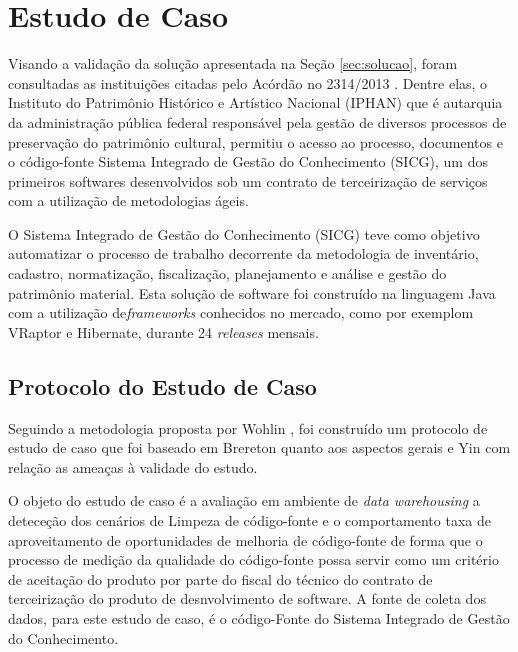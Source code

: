 \section {Estudo de Caso}

Visando a validação da solução apresentada na Seção \ref{sec:solucao}, foram consultadas as instituições citadas pelo Acórdão no 2314/2013 \cite{TCU:2013}. Dentre elas, o Instituto do Patrimônio Histórico e Artístico Nacional (IPHAN) que é autarquia da administração pública federal responsável pela gestão de diversos processos de preservação do patrimônio cultural, permitiu o acesso ao processo, documentos e o código-fonte Sistema Integrado de Gestão do Conhecimento (SICG), um dos primeiros softwares desenvolvidos sob um contrato de terceirização de serviços com a utilização de metodologias ágeis.

O Sistema Integrado de Gestão do Conhecimento (SICG) teve como objetivo automatizar o processo de trabalho decorrente da metodologia de inventário, cadastro, normatização, fiscalização, planejamento e análise e gestão do patrimônio material. Esta solução de software foi construído na linguagem Java com a utilização de\textit{frameworks} conhecidos no mercado, como por exemplom VRaptor e Hibernate, durante 24 \textit{releases} mensais.

\subsection{Protocolo do Estudo de Caso}
Seguindo a metodologia proposta por Wohlin \cite{wohlin2012experimentation}, foi construído um protocolo de estudo de caso que foi baseado em Brereton \cite{brereton2008using} quanto aos aspectos gerais e Yin \cite{yin2011applications} com relação as ameaças à validade do estudo. 

O objeto do estudo de caso é a avaliação em ambiente de \textit{data warehousing} a deteceção dos cenários de Limpeza de código-fonte e o comportamento taxa de aproveitamento de oportunidades de melhoria de código-fonte de forma que o processo de medição da qualidade do código-fonte possa servir como um critério de aceitação do produto por parte do fiscal do técnico do contrato de terceirização do produto de desnvolvimento de software. A fonte de coleta dos dados, para este estudo de caso, é o código-Fonte do Sistema Integrado de Gestão do Conhecimento.

